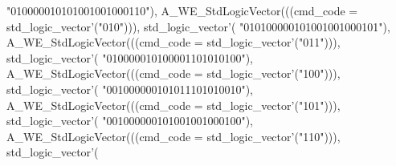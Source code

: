 \begin{DoxyCode}
{      "010000010101001001000110"}\textcolor{vhdlchar}{)}\textcolor{vhdlchar}{,} \textcolor{vhdlchar}{A\_WE\_StdLogicVector}\textcolor{vhdlchar}{(}\textcolor{vhdlchar}{(}\textcolor{vhdlchar}{(}\textcolor{vhdlchar}{cmd_code} \textcolor{vhdlchar}{=} \textcolor{comment}{std\_logic\_vector}\textcolor{vhdlchar}{'}\textcolor{vhdlchar}{(}\textcolor{vhdllogic}{"010"}\textcolor{vhdlchar}{)}\textcolor{vhdlchar}{)}\textcolor{vhdlchar}{)}\textcolor{vhdlchar}{,} \textcolor{comment}{std\_logic\_vector}\textcolor{vhdlchar}{'}\textcolor{vhdlchar}{(}\textcolor{vhdllogic}{
      "010100000101001001000101"}\textcolor{vhdlchar}{)}\textcolor{vhdlchar}{,} \textcolor{vhdlchar}{A\_WE\_StdLogicVector}\textcolor{vhdlchar}{(}\textcolor{vhdlchar}{(}\textcolor{vhdlchar}{(}\textcolor{vhdlchar}{cmd_code} \textcolor{vhdlchar}{=} \textcolor{comment}{std\_logic\_vector}\textcolor{vhdlchar}{'}\textcolor{vhdlchar}{(}\textcolor{vhdllogic}{"011"}\textcolor{vhdlchar}{)}\textcolor{vhdlchar}{)}\textcolor{vhdlchar}{)}\textcolor{vhdlchar}{,} \textcolor{comment}{std\_logic\_vector}\textcolor{vhdlchar}{'}\textcolor{vhdlchar}{(}\textcolor{vhdllogic}{
      "010000010100001101010100"}\textcolor{vhdlchar}{)}\textcolor{vhdlchar}{,} \textcolor{vhdlchar}{A\_WE\_StdLogicVector}\textcolor{vhdlchar}{(}\textcolor{vhdlchar}{(}\textcolor{vhdlchar}{(}\textcolor{vhdlchar}{cmd_code} \textcolor{vhdlchar}{=} \textcolor{comment}{std\_logic\_vector}\textcolor{vhdlchar}{'}\textcolor{vhdlchar}{(}\textcolor{vhdllogic}{"100"}\textcolor{vhdlchar}{)}\textcolor{vhdlchar}{)}\textcolor{vhdlchar}{)}\textcolor{vhdlchar}{,} \textcolor{comment}{std\_logic\_vector}\textcolor{vhdlchar}{'}\textcolor{vhdlchar}{(}\textcolor{vhdllogic}{
      "001000000101011101010010"}\textcolor{vhdlchar}{)}\textcolor{vhdlchar}{,} \textcolor{vhdlchar}{A\_WE\_StdLogicVector}\textcolor{vhdlchar}{(}\textcolor{vhdlchar}{(}\textcolor{vhdlchar}{(}\textcolor{vhdlchar}{cmd_code} \textcolor{vhdlchar}{=} \textcolor{comment}{std\_logic\_vector}\textcolor{vhdlchar}{'}\textcolor{vhdlchar}{(}\textcolor{vhdllogic}{"101"}\textcolor{vhdlchar}{)}\textcolor{vhdlchar}{)}\textcolor{vhdlchar}{)}\textcolor{vhdlchar}{,} \textcolor{comment}{std\_logic\_vector}\textcolor{vhdlchar}{'}\textcolor{vhdlchar}{(}\textcolor{vhdllogic}{
      "001000000101001001000100"}\textcolor{vhdlchar}{)}\textcolor{vhdlchar}{,} \textcolor{vhdlchar}{A\_WE\_StdLogicVector}\textcolor{vhdlchar}{(}\textcolor{vhdlchar}{(}\textcolor{vhdlchar}{(}\textcolor{vhdlchar}{cmd_code} \textcolor{vhdlchar}{=} \textcolor{comment}{std\_logic\_vector}\textcolor{vhdlchar}{'}\textcolor{vhdlchar}{(}\textcolor{vhdllogic}{"110"}\textcolor{vhdlchar}{)}\textcolor{vhdlchar}{)}\textcolor{vhdlchar}{)}\textcolor{vhdlchar}{,} \textcolor{comment}{std\_logic\_vector}\textcolor{vhdlchar}{'}\textcolor{vhdlchar}{(}\textcolor{vhdllogic}{
}
\end{DoxyCode}
